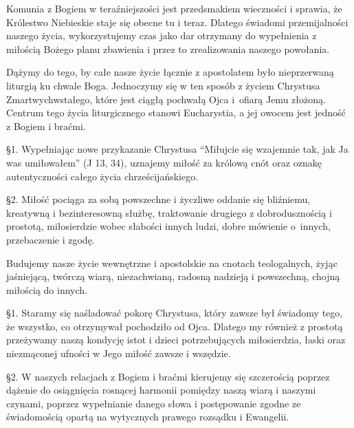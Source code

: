 

 Komunia z Bogiem w teraźniejszości jest przedsmakiem wieczności i sprawia, że Królestwo Niebieskie staje się obecne tu i teraz. Dlatego  świadomi przemijalności naszego życia, wykorzystujemy czas jako dar otrzymany do wypełnienia z miłością Bożego planu zbawienia i przez to zrealizowania naszego powołania.


 
 Dążymy do tego, by całe nasze życie łącznie z apostolatem było nieprzerwaną liturgią ku chwale Boga. Jednoczymy się w ten sposób z życiem Chrystusa Zmartwychwstałego, które jest ciągłą pochwałą Ojca \mbox{i ofiarą} Jemu złożoną. Centrum tego życia liturgicznego stanowi Eucharystia, a jej owocem jest jedność z Bogiem i braćmi.
 
 
 \S{}1. Wypełniając nowe przykazanie Chrystusa “Miłujcie się wzajemnie tak, jak Ja was umiłowałem” (J 13, 34), uznajemy miłość za królową cnót oraz oznakę autentyczności całego życia chrześcijańskiego.


\S{}2. Miłość pociąga za sobą powszechne i życzliwe oddanie się bliźniemu, kreatywną i bezinteresowną służbę, traktowanie drugiego z dobrodusznością i prostotą, miłosierdzie wobec słabości innych ludzi, dobre mówienie \mbox{o innych}, przebaczenie i zgodę.
 


 Budujemy nasze życie wewnętrzne i apostolskie na cnotach teologalnych, żyjąc jaśniejącą, twórczą wiarą, niezachwianą, radosną nadzieją i powszechną, chojną miłością do innych. 
 
\filbreak{}
 
 \S{}1. Staramy się naśladować pokorę Chrystusa, który zawsze był świadomy tego, że wszystko, co otrzymywał pochodziło od Ojca. Dlatego my również z prostotą przeżywamy naszą kondycję istot i dzieci potrzebujących miłosierdzia, łaski oraz niezmąconej ufności w Jego miłość zawsze i wszędzie.


\S{}2. W naszych relacjach z Bogiem i braćmi kierujemy się szczerością poprzez dążenie do osiągnięcia rosnącej harmonii pomiędzy naszą wiarą i naszymi czynami, poprzez wypełnianie danego słowa i postępowanie zgodne ze świadomością opartą na wytycznych prawego rozsądku i Ewangelii.
 
 
